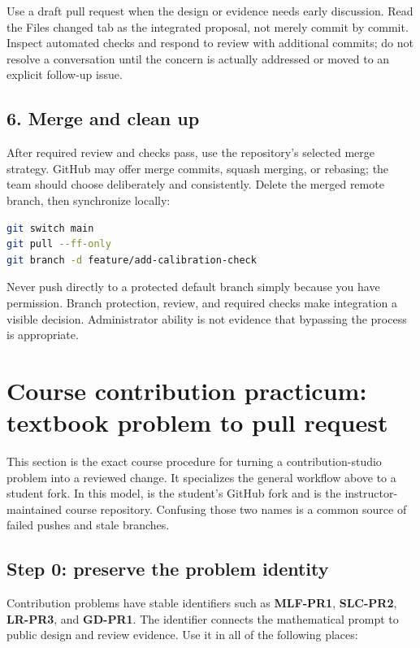 Use a draft pull request when the design or evidence needs early discussion.
Read the Files changed tab as the integrated proposal, not merely commit by
commit. Inspect automated checks and respond to review with additional commits;
do not resolve a conversation until the concern is actually addressed or moved
to an explicit follow-up issue.

\subsection*{6. Merge and clean up}

After required review and checks pass, use the repository's selected merge
strategy. GitHub may offer merge commits, squash merging, or rebasing; the team
should choose deliberately and consistently. Delete the merged remote branch,
then synchronize locally:

\begin{lstlisting}[language=bash,numbers=none]
git switch main
git pull --ff-only
git branch -d feature/add-calibration-check
\end{lstlisting}

\begin{professionalbox}
Never push directly to a protected default branch simply because you have
permission. Branch protection, review, and required checks make integration a
visible decision. Administrator ability is not evidence that bypassing the
process is appropriate.
\end{professionalbox}

\section{Course contribution practicum: textbook problem to pull request}
\label{sec:course-contribution-practicum}

This section is the exact course procedure for turning a contribution-studio
problem into a reviewed change. It specializes the general workflow above to a
student fork. In this model,  is the student's GitHub fork and
 is the instructor-maintained course repository. Confusing those
two names is a common source of failed pushes and stale branches.

\subsection*{Step 0: preserve the problem identity}

Contribution problems have stable identifiers such as \textbf{MLF-PR1},
\textbf{SLC-PR2}, \textbf{LR-PR3}, and \textbf{GD-PR1}. The identifier connects
the mathematical prompt to public design and review evidence. Use it in all of
the following places:

